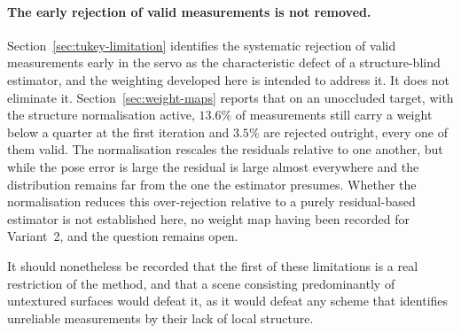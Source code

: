 \paragraph{The early rejection of valid measurements is not removed.}
Section~\ref{sec:tukey-limitation} identifies the systematic rejection of
valid measurements early in the servo as the characteristic defect of a
structure-blind estimator, and the weighting developed here is intended to
address it. It does not eliminate it. Section~\ref{sec:weight-maps} reports
that on an unoccluded target, with the structure normalisation active,
$13.6\%$ of measurements still carry a weight below a quarter at the first
iteration and $3.5\%$ are rejected outright, every one of them valid. The
normalisation rescales the residuals relative to one another, but while the
pose error is large the residual is large almost everywhere and the
distribution remains far from the one the estimator presumes. Whether the
normalisation reduces this over-rejection relative to a purely residual-based
estimator is not established here, no weight map having been recorded for
Variant~2, and the question remains open.

It should nonetheless be recorded that the first of these limitations is a
real restriction of the method, and that a scene consisting predominantly of
untextured surfaces would defeat it, as it would defeat any scheme that
identifies unreliable measurements by their lack of local structure.

%
%
